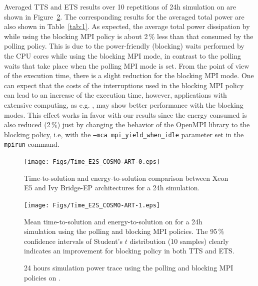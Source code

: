 Averaged TTS and ETS results  over 10 repetitions of 24h simulation on
\tinto are shown in  Figure~\ref{fig:4}. The corresponding results for
the  averaged total  power are  also shown  in  Table~\ref{tab:1}.  As
expected, the average total power dissipation by \cosmoart while using
the blocking MPI policy is about  2\,\% less than that consumed by the
polling  policy. This is  due to  the power-friendly  (blocking) waits
performed  by the  CPU cores  while using  the blocking  MPI  mode, in
contrast to  the polling  waits that take  place when the  polling MPI
mode is set. From the point of  view of the execution time, there is a
slight reduction  for the blocking MPI  mode. One can  expect that the
costs of the interruptions used in the blocking MPI policy can lead to
an  increase  of  the   execution  time,  however,  applications  with
extensive computing,  as e.g.  \cosmoart, may show  better performance
with the blocking  modes. This effect works in  favor with our results
since the energy consumed is also reduced (2\,\%) just by changing the
behavior of the OpenMPI library  to the blocking policy, i.e, with the
\texttt{--mca    mpi\_yield\_when\_idle}   parameter   set    in   the
\texttt{mpirun} command.

\begin{figure}[htbf]
  \centering
  \texttt{[image: Figs/Time\_E2S\_COSMO-ART-0.eps]}
  \caption{Time-to-solution and  energy-to-solution comparison between
    Xeon E5 and Ivy Bridge-EP architectures for a 24h simulation.}
  \label{fig:3}
\end{figure}

\begin{figure}[htbf]
  \centering
  \texttt{[image: Figs/Time\_E2S\_COSMO-ART-1.eps]}
  \vspace{-1cm}
  \caption{Mean time-to-solution and  energy-to-solution on \tinto for
    a 24h simulation using the  polling and blocking MPI policies. The
    95\,\%  confidence  intervals of  Student's  $t$ distribution  (10
    samples) clearly  indicates an improvement for  blocking policy in
    both TTS and ETS.}
  \label{fig:4}
\end{figure}

\begin{figure}[ht]
  \centering
  \hspace{0.8cm} \scalebox{0.62}{}
  \caption{24  hours  simulation power  trace  using  the polling  and
    blocking MPI policies on \tinto.}
  \label{fig:5}
\end{figure}

